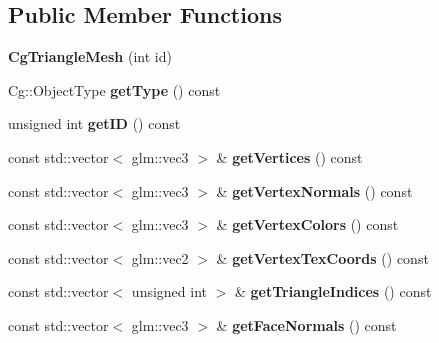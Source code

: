 \subsection*{Public Member Functions}
\begin{DoxyCompactItemize}
\item 
\mbox{\label{class_cg_triangle_mesh_a2898d05e4309930bf92d016d8c9ee7eb}} 
{\bfseries Cg\+Triangle\+Mesh} (int id)
\item 
\mbox{\label{class_cg_triangle_mesh_a2185ef6ff036917d08aefd9013c85317}} 
Cg\+::\+Object\+Type {\bfseries get\+Type} () const
\item 
\mbox{\label{class_cg_triangle_mesh_a963500b05f431492ebed9dee72ec23ae}} 
unsigned int {\bfseries get\+ID} () const
\item 
\mbox{\label{class_cg_triangle_mesh_a6e544e771e25dc4513554f7c0a4d09da}} 
const std\+::vector$<$ glm\+::vec3 $>$ \& {\bfseries get\+Vertices} () const
\item 
\mbox{\label{class_cg_triangle_mesh_a7a98cdaf4041221648187e66b2bbc25b}} 
const std\+::vector$<$ glm\+::vec3 $>$ \& {\bfseries get\+Vertex\+Normals} () const
\item 
\mbox{\label{class_cg_triangle_mesh_a2710bcff21b6348c2d48c07df813fdc1}} 
const std\+::vector$<$ glm\+::vec3 $>$ \& {\bfseries get\+Vertex\+Colors} () const
\item 
\mbox{\label{class_cg_triangle_mesh_afdbdbc20a21f82c26ae9899b2662912c}} 
const std\+::vector$<$ glm\+::vec2 $>$ \& {\bfseries get\+Vertex\+Tex\+Coords} () const
\item 
\mbox{\label{class_cg_triangle_mesh_a895245e342c41fc09c85ff762a014c01}} 
const std\+::vector$<$ unsigned int $>$ \& {\bfseries get\+Triangle\+Indices} () const
\item 
\mbox{\label{class_cg_triangle_mesh_ab24df17086fad155bb21fb088461f11a}} 
const std\+::vector$<$ glm\+::vec3 $>$ \& {\bfseries get\+Face\+Normals} () const

\end{DoxyCompactItemize}
